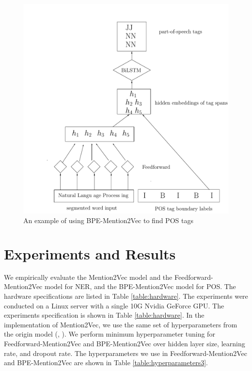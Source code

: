 \begin{figure}
  \centering
  \includegraphics[scale=0.6]{bpemention2vec.pdf}
 \caption{An example of using BPE-Mention2Vec to find POS tags}
  \label{fig:bpemention2vec}
\end{figure}

\section{Experiments and Results}

We empirically evaluate the Mention2Vec model and the Feedforward-Mention2Vec model for NER, and the BPE-Mention2Vec model for POS. The hardware specifications are listed in Table \ref{table:hardware}. The experiments were conducted on a Linux server with a single 10G Nvidia GeForce GPU. The experiments specification is shown in Table \ref{table:hardware}. In the implementation of Mention2Vec, we use the same set of hyperparameters from the origin model (\citeauthor{stratos2016mention2vec}, \citeyear{stratos2016mention2vec}). We perform minimum hyperparameter tuning for Feedforward-Mention2Vec and BPE-Mention2Vec over hidden layer size, learning rate, and dropout rate. The hyperparameters we use in Feedforward-Mention2Vec and BPE-Mention2Vec are shown in Table \ref{table:hyperparameters3}.

